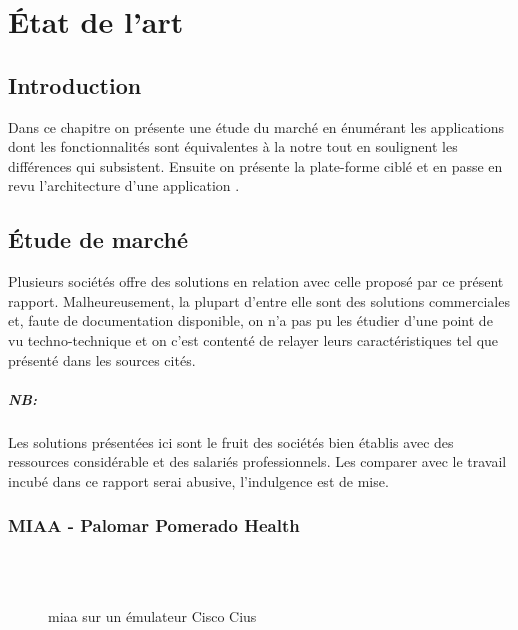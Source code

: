 
\chapter{État de l'art}
\section{Introduction}

Dans ce chapitre on présente une étude du marché en énumérant les
applications dont les fonctionnalités sont équivalentes à la notre tout
en soulignent les différences qui subsistent. Ensuite on présente la
plate-forme ciblé et en passe en revu l’architecture d’une application
\android{}.

\section{Étude de marché}

Plusieurs sociétés offre des solutions en relation avec celle proposé
par ce présent rapport. Malheureusement, la plupart d’entre elle sont
des solutions commerciales et, faute de documentation disponible, on n’a
pas pu les étudier d’une point de vu techno-technique et on c’est
contenté de relayer leurs caractéristiques tel que présenté dans les
sources cités.

\paragraph{NB:} %
\label{par:nb}

Les solutions présentées ici sont le fruit des sociétés bien établis avec des ressources considérable et des salariés professionnels. Les comparer avec le travail incubé dans ce rapport serai abusive, l’indulgence est de mise.

\subsection{MIAA - Palomar Pomerado Health}

\begin{figure}
\centering
{}\\
\\
\caption{\gls{miaa} sur un émulateur Cisco Cius}
\label{fig:miaa}
\end{figure}

